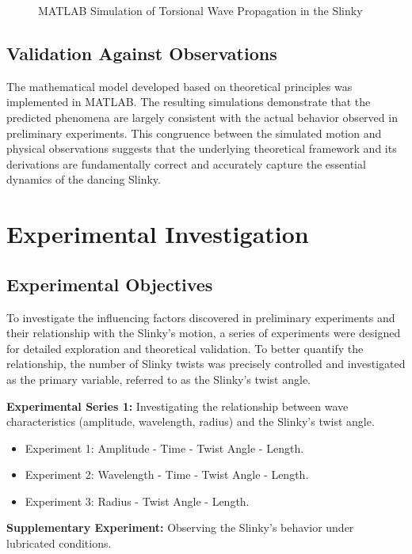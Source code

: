 \documentclass{mcmthesis}  %
\begin{document}
\begin{figure}[h!]
    \centering
    \caption{MATLAB Simulation of Torsional Wave Propagation in the Slinky}
    \label{fig:matlab_simulation}
\end{figure}

\subsection{Validation Against Observations}
The mathematical model developed based on theoretical principles was implemented in MATLAB. The resulting simulations demonstrate that the predicted phenomena are largely consistent with the actual behavior observed in preliminary experiments. This congruence between the simulated motion and physical observations suggests that the underlying theoretical framework and its derivations are fundamentally correct and accurately capture the essential dynamics of the dancing Slinky.

\section{Experimental Investigation}

\subsection{Experimental Objectives}
To investigate the influencing factors discovered in preliminary experiments and their relationship with the Slinky's motion, a series of experiments were designed for detailed exploration and theoretical validation. To better quantify the relationship, the number of Slinky twists was precisely controlled and investigated as the primary variable, referred to as the Slinky's twist angle.

\textbf{Experimental Series 1:} Investigating the relationship between wave characteristics (amplitude, wavelength, radius) and the Slinky's twist angle.
\begin{itemize}
    \item Experiment 1: Amplitude - Time - Twist Angle - Length.
    \item Experiment 2: Wavelength - Time - Twist Angle - Length.
    \item Experiment 3: Radius - Twist Angle - Length.
\end{itemize}

\textbf{Supplementary Experiment:} Observing the Slinky's behavior under lubricated conditions.
\end{document}
